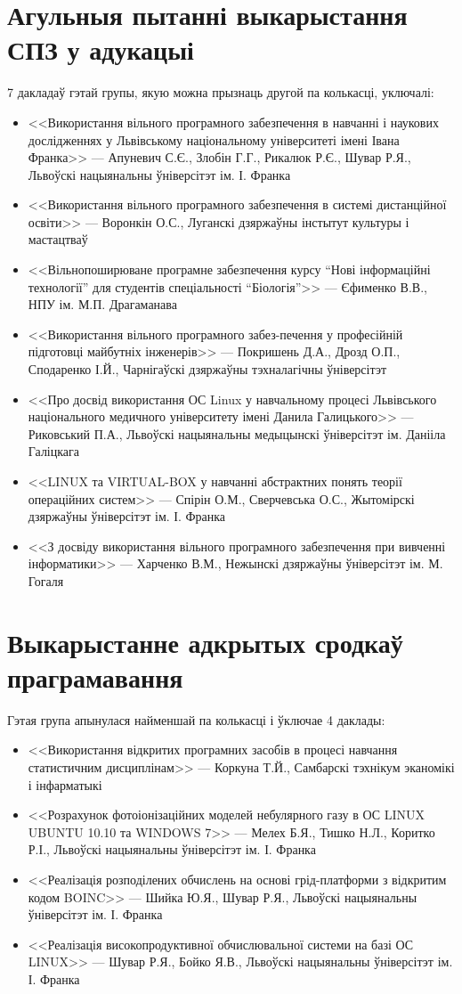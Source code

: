 \documentclass[10pt, a5paper]{article}
\begin{document}
\section{Агульныя пытанні выкарыстання СПЗ у адукацыі}
7 дакладаў гэтай групы, якую можна прызнаць другой па колькасці, уключалі:
\begin{itemize}
\item <<Використання вільного програмного забезпечення в навчанні і наукових дослідженнях у Львівському національному університеті імені Івана Франка>> --- Апуневич С.Є., Злобін Г.Г., Рикалюк Р.Є., Шувар Р.Я., Львоўскі нацыянальны ўніверсітэт ім. І. Франка
\item <<Використання вільного програмного забезпечення в системі дистанційної освіти>> --- Воронкін О.С., Луганскі дзяржаўны інстытут культуры і мастацтваў
\item <<Вільнопоширюване програмне забезпечення курсу “Нові інформаційні технології” для студентів спеціальності “Біологія”>> --- Єфименко В.В., НПУ ім. М.П. Драгаманава
\item <<Використання вільного програмного забез-печення у професійній підготовці майбутніх інженерів>> --- Покришень Д.А., Дрозд О.П., Сподаренко І.Й., Чарнігаўскі дзяржаўны тэхналагічны ўніверсітэт
\item  <<Про досвід використання ОС Linux у навчальному процесі Львівського національного медичного університету імені Данила Галицького>> --- Риковський П.А., Львоўскі нацыянальны медыцынскі ўніверсітэт ім. Данііла Галіцкага
\item  <<LINUX  та VIRTUAL-BOX у навчанні абстрактних понять теорії операційних систем>> --- Спірін О.М., Сверчевська О.С., Жытомірскі дзяржаўны ўніверсітэт ім. І. Франка
\item  <<З досвіду використання вільного програмного забезпечення при вивченні інформатики>> --- Харченко В.М., Нежынскі дзяржаўны ўніверсітэт ім. М. Гогаля
\end{itemize}

\section{Выкарыстанне адкрытых сродкаў праграмавання}
Гэтая група апынулася найменшай па колькасці і ўключае 4 даклады:
\begin{itemize}
\item <<Використання відкритих програмних засобів в процесі навчання статистичним дисциплінам>> --- Коркуна Т.Й., Самбарскі тэхнікум эканомікі і інфарматыкі
\item <<Розрахунок фотоіонізаційних моделей небулярного газу в ОС LINUX UBUNTU 10.10 та WINDOWS 7>> --- Мелех Б.Я., Тишко Н.Л., Коритко Р.І., Львоўскі нацыянальны ўніверсітэт ім. І. Франка
\item <<Реалізація розподілених обчислень на основі грід-платформи з відкритим кодом BOINC>> --- Шийка Ю.Я., Шувар Р.Я., Львоўскі нацыянальны ўніверсітэт ім. І. Франка
\item <<Реалізація високопродуктивної обчислювальної системи на базі ОС  LINUX>> --- Шувар Р.Я., Бойко Я.В., Львоўскі нацыянальны ўніверсітэт ім. І. Франка
\end{itemize}
\end{document}
